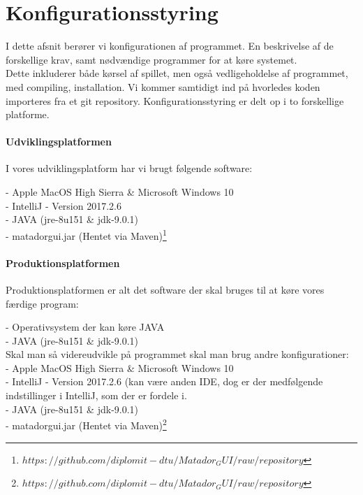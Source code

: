 \chapter{Konfigurationsstyring}

I dette afsnit berører vi konfigurationen af programmet.
En beskrivelse af de forskellige krav, samt nødvændige programmer for at køre systemet. 
\\Dette inkluderer både kørsel af spillet, men også vedligeholdelse af programmet, med compiling, installation.
Vi kommer samtidigt ind på hvorledes koden importeres fra et git repository.
Konfigurationsstyring er delt op i to forskellige platforme. \\

\subsubsection{Udviklingsplatformen}

I vores udviklingsplatform har vi brugt følgende software:

\noindent - Apple MacOS High Sierra \& Microsoft Windows 10 \\
- IntelliJ - Version 2017.2.6 \\
- JAVA (jre-8u151 \& jdk-9.0.1) \\
- matadorgui.jar (Hentet via Maven)\footnote{$https://github.com/diplomit-dtu/Matador_GUI/raw/repository$}\\

\subsubsection{Produktionsplatformen}
Produktionsplatformen er alt det software der skal bruges til at køre vores færdige program:

\noindent - Operativsystem der kan køre JAVA\\
- JAVA (jre-8u151 \& jdk-9.0.1) \\

\noindent Skal man så videreudvikle på programmet skal man brug andre konfigurationer:\\
\noindent - Apple MacOS High Sierra \& Microsoft Windows 10 \\
- IntelliJ - Version 2017.2.6 (kan være anden IDE, dog er der medfølgende indstillinger i IntelliJ, som der er fordele i. \\
- JAVA (jre-8u151 \& jdk-9.0.1) \\
- matadorgui.jar (Hentet via Maven)\footnote{$https://github.com/diplomit-dtu/Matador_GUI/raw/repository$}\\


